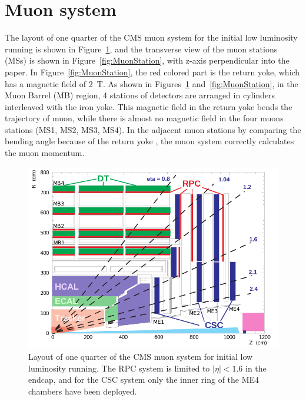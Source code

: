   
\section{Muon system}

The layout of one quarter of the CMS muon system for the initial low luminosity running is shown in 
Figure~\ref{fig:Muonsystem},  and the transverse view of the muon stations (MSs) is shown in 
Figure~\ref{fig:MuonStation}, with z-axis perpendicular into the paper. In 
Figure~\ref{fig:MuonStation}, the red colored part is the return yoke, which has a magnetic field of
2~T. As shown in Figures~\ref{fig:Muonsystem} and~\ref{fig:MuonStation},  in the Muon Barrel (MB) region, 4 stations of detectors are arranged in cylinders interleaved with the iron yoke.   
This magnetic field in the return yoke bends the trajectory of muon, while there is almost no magnetic field in the 
four muons stations (MS1, MS2, MS3, MS4). In the adjacent muon stations by comparing the bending angle because of the return yoke , the muon system correctly calculates the muon momentum. 

\begin{figure}
\centering
\includegraphics[width=.9\textwidth]{figures/Muonsystem.png}
\caption{Layout of one quarter of the CMS muon system for initial low luminosity running. The 
RPC system is limited to $|\eta| < 1.6$ in the endcap, and for the CSC system only the inner ring of the ME4 chambers  have been deployed.}
\label{fig:Muonsystem}
\end{figure}

